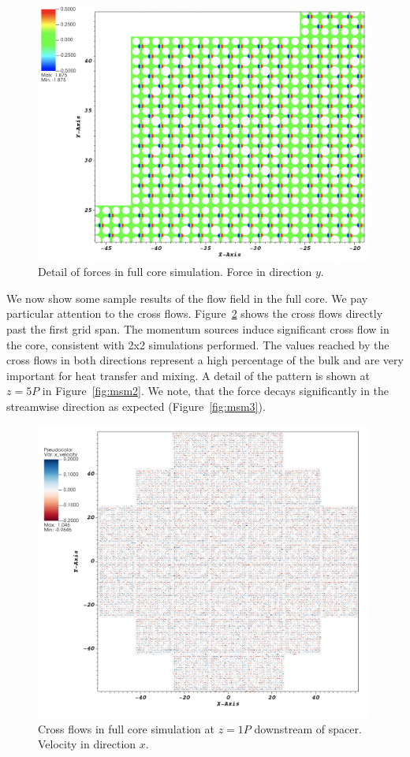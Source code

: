 \begin{figure}[!ht]
\centering
\includegraphics[width=0.99\textwidth]{./figures/1span_msm.png}
\caption{Detail of forces in full core simulation. Force in direction $y$. }
\label{fig:msm}
\end{figure}

We now show some sample results of the flow field in the full core. We pay particular attention to the cross flows. Figure~\ref{fig:msm1} shows the cross flows directly past the first grid span. The momentum sources induce significant cross flow in the core, consistent with 2x2 simulations performed. The values reached by the cross flows in both directions represent a high percentage of the bulk and are very important for heat transfer and mixing. A detail of the pattern is shown at $z=5P$ in Figure~\ref{fig:msm2}. We note, that the force decays significantly in the streamwise direction as expected (Figure~\ref{fig:msm3}).

\begin{figure}[!ht]
\centering
\includegraphics[width=0.99\textwidth]{./figures/fullcore_msm_v01.png}
\caption{Cross flows in full core simulation at $z=1P$ downstream of spacer. Velocity in direction $x$. }
\label{fig:msm1}
\end{figure}

